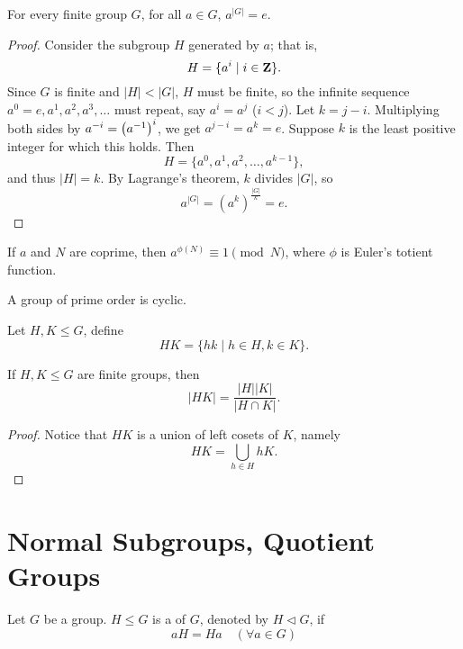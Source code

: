 \begin{theorem}
For every finite group $G$, for all $a \in G$, $a^{|G|}=e$.
\end{theorem}

\begin{proof}
Consider the subgroup $H$ generated by $a$; that is,
\[H=\{a^i\mid i\in\mathbf Z\}.\]
Since $G$ is finite and $|H|<|G|$, $H$ must be finite, so the infinite sequence $a^0=e,a^1,a^2,a^3,\dots$ must repeat, say $a^i=a^j$ ($i<j$). Let $k=j-i$. Multiplying both sides by $a^{-i}=\left(a^{-1}\right)^i$, we get $a^{j-i} = a^k = e$. Suppose $k$ is the least positive integer for which this holds. Then
\[H=\{a^0,a^1,a^2,\dots,a^{k-1}\},\]
and thus $|H|=k$. By Lagrange's theorem, $k$ divides $|G|$, so
\[a^{|G|}=(a^k)^\frac{|G|}{k}=e.\]
\end{proof}

\begin{theorem}
If $a$ and $N$ are coprime, then $a^{\phi(N)}\equiv1\pmod N$, where $\phi$ is Euler's totient function.
\end{theorem}

\begin{proposition}
A group of prime order is cyclic.
\end{proposition}

\begin{definition}
Let $H,K\le G$, define
\[HK=\{hk\mid h\in H,k\in K\}.\]
\end{definition}

\begin{proposition}
If $H,K\le G$ are finite groups, then
\[|HK|=\frac{|H||K|}{|H\cap K|}.\]
\end{proposition}

\begin{proof}
Notice that $HK$ is a union of left cosets of $K$, namely
\[HK=\bigcup_{h\in H}hK.\]

\end{proof}
\pagebreak

\section{Normal Subgroups, Quotient Groups}
\begin{definition}
Let $G$ be a group. $H\le G$ is a  of $G$, denoted by $H\triangleleft G$, if
\[aH=Ha\quad(\forall a\in G)\]
\end{definition}

